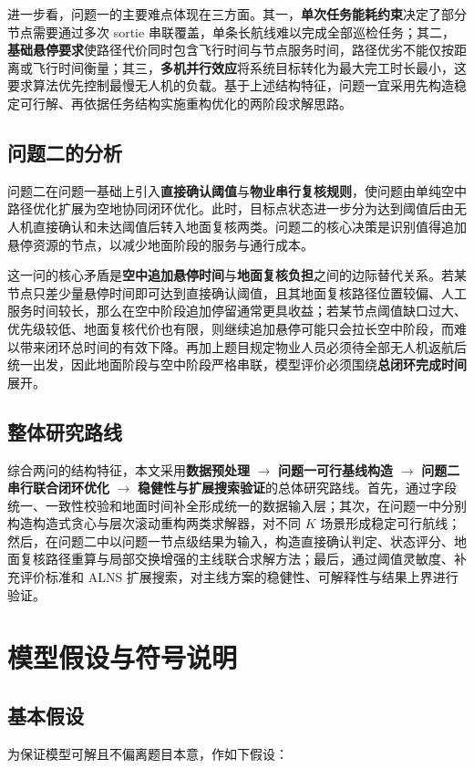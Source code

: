 \documentclass[12pt]{article}
\begin{document}
进一步看，问题一的主要难点体现在三方面。其一，\textbf{单次任务能耗约束}决定了部分节点需要通过多次 sortie 串联覆盖，单条长航线难以完成全部巡检任务；其二，\textbf{基础悬停要求}使路径代价同时包含飞行时间与节点服务时间，路径优劣不能仅按距离或飞行时间衡量；其三，\textbf{多机并行效应}将系统目标转化为最大完工时长最小，这要求算法优先控制最慢无人机的负载。基于上述结构特征，问题一宜采用先构造稳定可行解、再依据任务结构实施重构优化的两阶段求解思路。

\subsection{问题二的分析}
问题二在问题一基础上引入\textbf{直接确认阈值}与\textbf{物业串行复核规则}，使问题由单纯空中路径优化扩展为空地协同闭环优化。此时，目标点状态进一步分为达到阈值后由无人机直接确认和未达阈值后转入地面复核两类。问题二的核心决策是识别值得追加悬停资源的节点，以减少地面阶段的服务与通行成本。

这一问的核心矛盾是\textbf{空中追加悬停时间}与\textbf{地面复核负担}之间的边际替代关系。若某节点只差少量悬停时间即可达到直接确认阈值，且其地面复核路径位置较偏、人工服务时间较长，那么在空中阶段追加停留通常更具收益；若某节点阈值缺口过大、优先级较低、地面复核代价也有限，则继续追加悬停可能只会拉长空中阶段，而难以带来闭环总时间的有效下降。再加上题目规定物业人员必须待全部无人机返航后统一出发，因此地面阶段与空中阶段严格串联，模型评价必须围绕\textbf{总闭环完成时间}展开。

\subsection{整体研究路线}
综合两问的结构特征，本文采用\textbf{数据预处理} $\rightarrow$ \textbf{问题一可行基线构造} $\rightarrow$ \textbf{问题二串行联合闭环优化} $\rightarrow$ \textbf{稳健性与扩展搜索验证}的总体研究路线。首先，通过字段统一、一致性校验和地面时间补全形成统一的数据输入层；其次，在问题一中分别构造构造式贪心与层次滚动重构两类求解器，对不同 $K$ 场景形成稳定可行航线；然后，在问题二中以问题一节点级结果为输入，构造直接确认判定、状态评分、地面复核路径重算与局部交换增强的主线联合求解方法；最后，通过阈值灵敏度、补充评价标准和 ALNS 扩展搜索，对主线方案的稳健性、可解释性与结果上界进行验证。

\section{模型假设与符号说明}

\subsection{基本假设}
为保证模型可解且不偏离题目本意，作如下假设：
\end{document}
